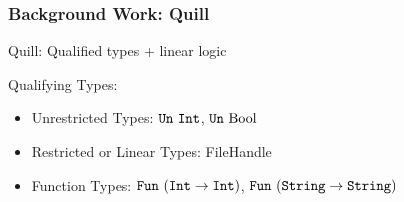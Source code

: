 \begin{frame}[fragile, c]
  \frametitle{Background Work: Quill}
  \begin{center}
    Quill\citep{morris_best_2016}: {\color{blue}Qu}al{\color{blue}i}fied types + {\color{blue}l}inear {\color{blue}l}ogic\\
  \end{center}
  Qualifying Types:
  \begin{itemize}
  \item Unrestricted Types: $\texttt{Un}\ \texttt{Int}$, $\texttt{Un}\ \text{Bool}$
  \item Restricted or Linear Types: FileHandle
  \item Function Types: $\texttt{Fun}\ (\texttt{Int} \rightarrow \texttt{Int})$,
    $\texttt{Fun}\ (\texttt{String} \rightarrow \texttt{String})$
  \end{itemize}
\end{frame}

